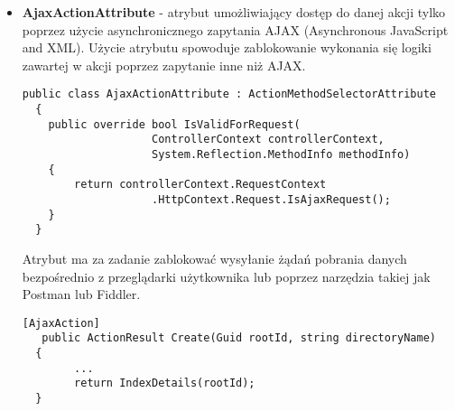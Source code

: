 \begin{itemize}
  \item \textbf{AjaxActionAttribute} - atrybut umożliwiający dostęp do danej akcji tylko poprzez użycie asynchronicznego zapytania AJAX (Asynchronous JavaScript and XML). Użycie atrybutu spowoduje zablokowanie wykonania się logiki zawartej w akcji poprzez zapytanie inne niż AJAX. 
   \\
  \begin{lstlisting}[caption=Kod atrybutu Automap]
  public class AjaxActionAttribute : ActionMethodSelectorAttribute
  {
  	public override bool IsValidForRequest(
				  	ControllerContext controllerContext, 
				  	System.Reflection.MethodInfo methodInfo)
  	{
  		return controllerContext.RequestContext
  					.HttpContext.Request.IsAjaxRequest();
  	}
  }
   \end{lstlisting}
  Atrybut ma za zadanie zablokować wysyłanie żądań pobrania danych bezpośrednio z przeglądarki użytkownika lub poprzez narzędzia takiej jak Postman lub Fiddler.
  \\
  \begin{lstlisting}[caption=Wykorzystanie atrybutu AjaxAction]
  [AjaxAction]
   public ActionResult Create(Guid rootId, string directoryName)
  {
 		...
  		return IndexDetails(rootId);  	
  }
  

\end{lstlisting}
\end{itemize}
